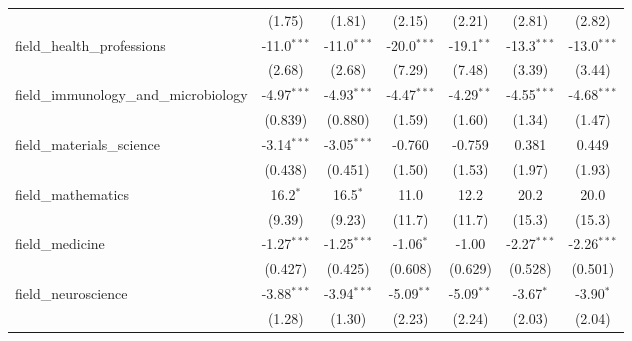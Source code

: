\begin{tabular}{lcccccc}
                                                               & (1.75)         & (1.81)         & (2.15)        & (2.21)        & (2.81)        & (2.82)\\   
   field\_health\_professions                                  & -11.0$^{***}$  & -11.0$^{***}$  & -20.0$^{***}$ & -19.1$^{**}$  & -13.3$^{***}$ & -13.0$^{***}$\\   
                                                               & (2.68)         & (2.68)         & (7.29)        & (7.48)        & (3.39)        & (3.44)\\   
   field\_immunology\_and\_microbiology                        & -4.97$^{***}$  & -4.93$^{***}$  & -4.47$^{***}$ & -4.29$^{**}$  & -4.55$^{***}$ & -4.68$^{***}$\\   
                                                               & (0.839)        & (0.880)        & (1.59)        & (1.60)        & (1.34)        & (1.47)\\   
   field\_materials\_science                                   & -3.14$^{***}$  & -3.05$^{***}$  & -0.760        & -0.759        & 0.381         & 0.449\\   
                                                               & (0.438)        & (0.451)        & (1.50)        & (1.53)        & (1.97)        & (1.93)\\   
   field\_mathematics                                          & 16.2$^{*}$     & 16.5$^{*}$     & 11.0          & 12.2          & 20.2          & 20.0\\   
                                                               & (9.39)         & (9.23)         & (11.7)        & (11.7)        & (15.3)        & (15.3)\\   
   field\_medicine                                             & -1.27$^{***}$  & -1.25$^{***}$  & -1.06$^{*}$   & -1.00         & -2.27$^{***}$ & -2.26$^{***}$\\   
                                                               & (0.427)        & (0.425)        & (0.608)       & (0.629)       & (0.528)       & (0.501)\\   
   field\_neuroscience                                         & -3.88$^{***}$  & -3.94$^{***}$  & -5.09$^{**}$  & -5.09$^{**}$  & -3.67$^{*}$   & -3.90$^{*}$\\   
                                                               & (1.28)         & (1.30)         & (2.23)        & (2.24)        & (2.03)        & (2.04)\\   

\end{tabular}
